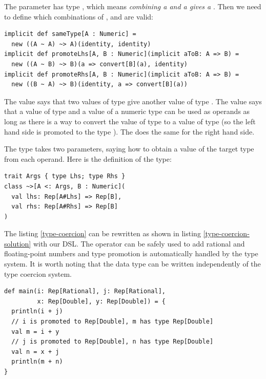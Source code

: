 \documentclass[american,english,runningheads]{llncs}
\begin{document}
The  parameter has type , which means \emph{combining a  and a  gives a
}. Then we need to define which combinations of ,  and  are valid:

\begin{lstlisting}
implicit def sameType[A : Numeric] =
  new ((A ~ A) ~> A)(identity, identity)
implicit def promoteLhs[A, B : Numeric](implicit aToB: A => B) =
  new ((A ~ B) ~> B)(a => convert[B](a), identity)
implicit def promoteRhs[A, B : Numeric](implicit aToB: A => B) =
  new ((B ~ A) ~> B)(identity, a => convert[B](a))
\end{lstlisting}

The  value says that two values of type  give another value of type . The
 value says that a value of type  and a value of a numeric type  can be used as
operands as long as there is a way to convert the value of type  to a value of type  (so the left
hand side is promoted to the type ). The  does the same for the right hand side.

The \code{\~\>} type takes two parameters, saying how to obtain a value of the target type from each operand. Here is
the definition of the \code{\~\>} type:

\begin{lstlisting}
trait Args { type Lhs; type Rhs }
class ~>[A <: Args, B : Numeric](
  val lhs: Rep[A#Lhs] => Rep[B],
  val rhs: Rep[A#Rhs] => Rep[B]
)
\end{lstlisting}

The listing \ref{type-coercion} can be rewritten as shown in listing \ref{type-coercion-solution} with our DSL.
The \code{+} operator can be safely used to add rational and floating-point numbers and type promotion is
automatically handled by the type system. It is worth noting that the  data type can be written
independently of the type coercion system.

\begin{lstlisting}[label=type-coercion-solution,caption=Type-coercion automatically handled by our DSL]
def main(i: Rep[Rational], j: Rep[Rational],
         x: Rep[Double], y: Rep[Double]) = {
  println(i + j)
  // i is promoted to Rep[Double], m has type Rep[Double]
  val m = i + y
  // j is promoted to Rep[Double], n has type Rep[Double]
  val n = x + j
  println(m + n)
}
\end{lstlisting}
\end{document}
